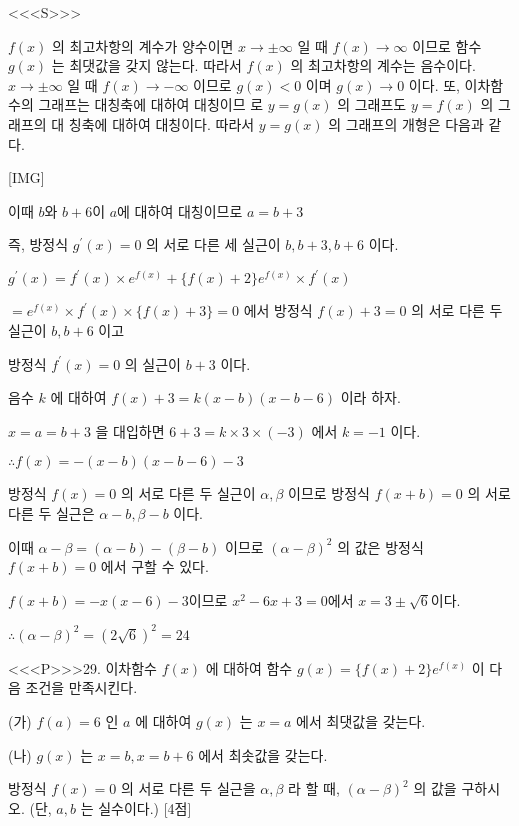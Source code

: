\documentclass{oblivoir}
\begin{document}
<<<S>>>



$f(x)$ 의 최고차항의 계수가 양수이면 $x \rightarrow \pm \infty$ 일 때 $f(x) \rightarrow \infty$ 이므로 함수 $g(x)$ 는 최댓값을 갖지 않는다.
따라서 $f(x)$ 의 최고차항의 계수는 음수이다. $x \rightarrow \pm \infty$ 일 때 $f(x) \rightarrow-\infty$ 이므로 $g(x)<0$ 이며 $g(x) \rightarrow 0$ 이다.
또, 이차함수의 그래프는 대칭축에 대하여 대칭이므 로 $y=g(x)$ 의 그래프도 $y=f(x)$ 의 그래프의 대 칭축에 대하여 대칭이다.
따라서 $y=g(x)$ 의 그래프의 개형은 다음과 같다.

[IMG]

이때 $b$와 $b+6$이 $a$에 대하여 대칭이므로 $a=b+3$ 

즉, 방정식 $g^{\prime}(x)=0$ 의 서로 다른 세 실근이 $b, b+3, b+6$ 이다.

$g^{\prime}(x)=f^{\prime}(x) \times e^{f(x)}+\{f(x)+2\} e^{f(x)} \times f^{\prime}(x)$

$=e^{f(x)} \times f^{\prime}(x) \times\{f(x)+3\}=0$ 에서 방정식 $f(x)+3=0$ 의 서로 다른 두 실근이 $b, b+6$ 이고

방정식 $f^{\prime}(x)=0$ 의 실근이 $b+3$ 이다.

음수 $k$ 에 대하여 $f(x)+3=k(x-b)(x-b-6)$ 이라 하자.

$x=a=b+3$ 을 대입하면 $6+3=k \times 3 \times(-3)$ 에서 $k=-1$ 이다.

$\therefore f(x)=-(x-b)(x-b-6)-3$

방정식 $f(x)=0$ 의 서로 다른 두 실근이 $\alpha, \beta$ 이므로 방정식 $f(x+b)=0$ 의 서로 다른 두 실근은 $\alpha-b, \beta-b$ 이다.

이때 $\alpha-\beta=(\alpha-b)-(\beta-b)$ 이므로 $(\alpha-\beta)^{2}$ 의 값은 방정식 $f(x+b)=0$ 에서 구할 수 있다.

$f(x+b)=-x(x-6)-3$이므로 $x^{2}-6 x+3=0$에서 $x=3 \pm \sqrt{6}$이다.

$\therefore(\alpha-\beta)^{2}=(2 \sqrt{6})^{2}=24$



<<<P>>>29. 이차함수 $f(x)$ 에 대하여 함수 $g(x)=\{f(x)+2\} e^{f(x)}$ 이 다음 조건을 만족시킨다.

(가) $f(a)=6$ 인 $a$ 에 대하여 $g(x)$ 는 $x=a$ 에서 최댓값을 갖는다.

(나) $g(x)$ 는 $x=b, x=b+6$ 에서 최솟값을 갖는다.

방정식 $f(x)=0$ 의 서로 다른 두 실근을 $\alpha, \beta$ 라 할 때, $(\alpha-\beta)^{2}$ 의 값을 구하시오. (단, $a, b$ 는 실수이다.) [4점]
\end{document}

